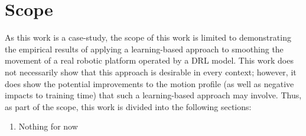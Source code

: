 \section{Scope}
As this work is a case-study, the scope of this work is limited to demonstrating the empirical results of applying a learning-based approach to smoothing the movement of a real robotic platform operated by a DRL model. This work does not necessarily show that this approach is desirable in every context; however, it does show the potential improvements to the motion profile (as well as negative impacts to training time) that such a learning-based approach may involve. Thus, as part of the scope, this work is divided into the following sections:

\begin{enumerate}
\item Nothing for now
\end{enumerate}